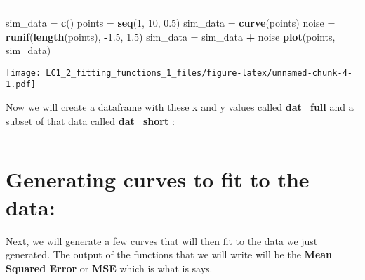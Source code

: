 \documentclass[]{article}
\newenvironment{Shaded}{\begin{snugshade}}{\end{snugshade}}
\newcommand{\KeywordTok}[1]{\textcolor[rgb]{0.13,0.29,0.53}{\textbf{#1}}}
\newcommand{\DecValTok}[1]{\textcolor[rgb]{0.00,0.00,0.81}{#1}}
\newcommand{\FloatTok}[1]{\textcolor[rgb]{0.00,0.00,0.81}{#1}}
\newcommand{\StringTok}[1]{\textcolor[rgb]{0.31,0.60,0.02}{#1}}
\newcommand{\CommentTok}[1]{\textcolor[rgb]{0.56,0.35,0.01}{\textit{#1}}}
\newcommand{\OperatorTok}[1]{\textcolor[rgb]{0.81,0.36,0.00}{\textbf{#1}}}
\newcommand{\NormalTok}[1]{#1}
\begin{document}
\begin{center}\rule{0.5\linewidth}{\linethickness}\end{center}

\begin{Shaded}
\begin{Highlighting}[]
\NormalTok{sim_data =}\StringTok{ }\KeywordTok{c}\NormalTok{()}
\NormalTok{points =}\StringTok{ }\KeywordTok{seq}\NormalTok{(}\DecValTok{1}\NormalTok{, }\DecValTok{10}\NormalTok{, }\FloatTok{0.5}\NormalTok{)}
\NormalTok{sim_data =}\StringTok{ }\KeywordTok{curve}\NormalTok{(points)}
\NormalTok{noise =}\StringTok{ }\KeywordTok{runif}\NormalTok{(}\KeywordTok{length}\NormalTok{(points), }\OperatorTok{-}\FloatTok{1.5}\NormalTok{, }\FloatTok{1.5}\NormalTok{)}
\NormalTok{sim_data =}\StringTok{ }\NormalTok{sim_data }\OperatorTok{+}\StringTok{ }\NormalTok{noise}
\KeywordTok{plot}\NormalTok{(points, sim_data)}
\end{Highlighting}
\end{Shaded}

\texttt{[image: LC1\_2\_fitting\_functions\_1\_files/figure-latex/unnamed-chunk-4-1.pdf]}

Now we will create a dataframe with these x and y values called
\textbf{dat\_full} and a subset of that data called \textbf{dat\_short}
:

\begin{Shaded}
\end{Shaded}

\begin{center}\rule{0.5\linewidth}{\linethickness}\end{center}

\section{Generating curves to fit to the
data:}\label{generating-curves-to-fit-to-the-data}

Next, we will generate a few curves that will then fit to the data we
just generated. The output of the functions that we will write will be
the \textbf{Mean Squared Error} or \textbf{MSE} which is what is says.
\end{document}

